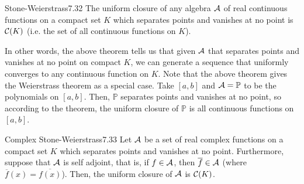 \setcounter{rudin}{31}

\begin{theorem}{Stone-Weierstrass}{7.32}
    The uniform closure of any algebra $\mathcal{A}$ of real continuous functions on a compact set $K$ which separates points and vanishes at no point is $\mathcal{C}(K)$ (i.e. the set of all continuous functions on $K$).
\end{theorem}
\noindent In other words, the above theorem tells us that given $\mathcal{A}$ that separates points and vanishes at no point on compact $K$, we can generate a sequence that uniformly converges to any continuous function on $K$. Note that the above theorem gives the Weierstrass theorem as a special case. Take $[a, b]$ and $\mathcal{A} = \mathbb{P}$ to be the polynomials on $[a, b]$. Then, $\mathbb{P}$ separates points and vanishes at no point, so according to the theorem, the uniform closure of $\mathbb{P}$ is all continuous functions on $[a, b]$. 

\begin{theorem}{Complex Stone-Weierstrass}{7.33}
    Let $\mathcal{A}$ be a set of real complex functions on a compact set $K$ which separates points and vanishes at no point. Furthermore, suppose that $\mathcal{A}$ is self adjoint, that is, if $f \in \mathcal{A}$, then $\overline{f} \in \mathcal{A}$ (where $\overline{f}(x) = \overline{f(x)}$). Then, the uniform closure of $\mathcal{A}$ is $\mathcal{C}(K)$. 
\end{theorem}



